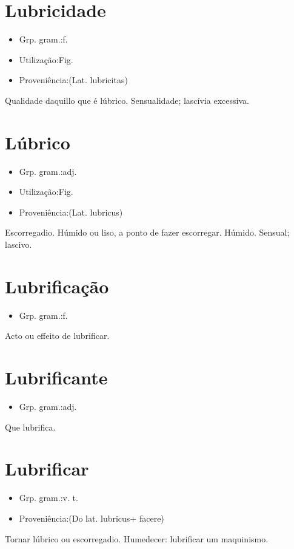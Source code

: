 \section{Lubricidade}
\begin{itemize}
\item {Grp. gram.:f.}
\end{itemize}
\begin{itemize}
\item {Utilização:Fig.}
\end{itemize}
\begin{itemize}
\item {Proveniência:(Lat. \textunderscore lubricitas\textunderscore )}
\end{itemize}
Qualidade daquillo que é lúbrico.
Sensualidade; lascívia excessiva.
\section{Lúbrico}
\begin{itemize}
\item {Grp. gram.:adj.}
\end{itemize}
\begin{itemize}
\item {Utilização:Fig.}
\end{itemize}
\begin{itemize}
\item {Proveniência:(Lat. \textunderscore lubricus\textunderscore )}
\end{itemize}
Escorregadio.
Húmido ou liso, a ponto de fazer escorregar.
Húmido.
Sensual; lascivo.
\section{Lubrificação}
\begin{itemize}
\item {Grp. gram.:f.}
\end{itemize}
Acto ou effeito de lubrificar.
\section{Lubrificante}
\begin{itemize}
\item {Grp. gram.:adj.}
\end{itemize}
Que lubrifica.
\section{Lubrificar}
\begin{itemize}
\item {Grp. gram.:v. t.}
\end{itemize}
\begin{itemize}
\item {Proveniência:(Do lat. \textunderscore lubricus\textunderscore  + \textunderscore facere\textunderscore )}
\end{itemize}
Tornar lúbrico ou escorregadio.
Humedecer: \textunderscore lubrificar um maquinismo\textunderscore .
